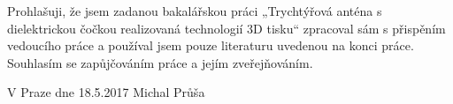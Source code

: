 % 
% 
%
Prohlašuji, že jsem zadanou bakalářskou práci „Trychtýřová anténa s dielektrickou čočkou realizovaná technologií 3D tisku“ zpracoval sám s přispěním vedoucího práce a používal jsem pouze literaturu uvedenou na konci práce. Souhlasím se zapůjčováním práce a jejím zveřejňováním.
\vspace{2cm}

\noindent V Praze dne 18.5.2017 \hfill Michal Průša